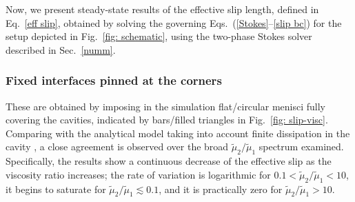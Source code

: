 
Now, we present steady-state results of the effective slip length, defined in Eq.\ \eqref{eff slip}, obtained by solving the governing Eqs.\ (\ref{Stokes}--\ref{slip bc}) for the setup depicted in Fig.\ \ref{fig: schematic}, using the two-phase Stokes solver described in Sec.\ \ref{numm}. 

\subsubsection{Fixed interfaces pinned at the corners}
  
These are obtained by imposing in the simulation flat/circular menisci fully covering the cavities, indicated by bars/filled triangles in Fig.\ \ref{fig: slip-visc}. Comparing with the analytical model taking into account finite dissipation in the cavity \citep{Schonecker}, a close agreement is observed over the broad $\tilde{\mu}_2/\tilde{\mu}_1$ spectrum examined. 
Specifically, the results show a continuous decrease of the effective slip as the viscosity ratio increases; the rate of variation is logarithmic for $0.1 < \tilde{\mu}_2/\tilde{\mu}_1 < 10$, it begins to saturate for $\tilde{\mu}_2/\tilde{\mu}_1 \lesssim 0.1$, and it is practically zero for $\tilde{\mu}_2/\tilde{\mu}_1 > 10$. 

